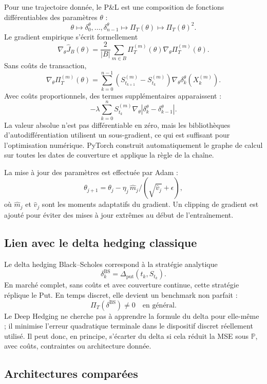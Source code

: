 \documentclass[11pt,a4paper]{article}
\begin{document}
Pour une trajectoire donnée, le P\&L est une composition de fonctions
différentiables des paramètres $\theta$ :
\[
\theta
\mapsto
\delta_0^\theta,\ldots,\delta_{n-1}^\theta
\mapsto
\Pi_T(\theta)
\mapsto
\Pi_T(\theta)^2.
\]
Le gradient empirique s'écrit formellement
\[
\nabla_\theta \widehat{J}_B(\theta)
=
\frac{2}{|B|}
\sum_{m\in B}
\Pi_T^{(m)}(\theta)
\nabla_\theta \Pi_T^{(m)}(\theta).
\]
Sans coûts de transaction,
\[
\nabla_\theta \Pi_T^{(m)}(\theta)
=
\sum_{k=0}^{n-1}
\left(S_{t_{k+1}}^{(m)}-S_{t_k}^{(m)}\right)
\nabla_\theta \delta_k^\theta(X_k^{(m)}).
\]
Avec coûts proportionnels, des termes supplémentaires apparaissent :
\[
-\lambda
\sum_{k=0}^{n}
S_{t_k}^{(m)}
\nabla_\theta
\left|
\delta_k^\theta-\delta_{k-1}^\theta
\right|.
\]
La valeur absolue n'est pas différentiable en zéro, mais les bibliothèques
d'autodifférentiation utilisent un sous-gradient, ce qui est suffisant pour
l'optimisation numérique. PyTorch construit automatiquement le graphe de calcul
sur toutes les dates de couverture et applique la règle de la chaîne.

La mise à jour des paramètres est effectuée par Adam :
\[
\theta_{j+1}
=
\theta_j-\eta_j\,\widehat{m}_j/(\sqrt{\widehat{v}_j}+\epsilon),
\]
où $\widehat{m}_j$ et $\widehat{v}_j$ sont les moments adaptatifs du gradient.
Un clipping de gradient est ajouté pour éviter des mises à jour extrêmes au
début de l'entraînement.

\subsection{Lien avec le delta hedging classique}

Le delta hedging Black--Scholes correspond à la stratégie analytique
\[
\delta_k^{\mathrm{BS}}
=
\Delta_{\mathrm{put}}(t_k,S_{t_k}).
\]
En marché complet, sans coûts et avec couverture continue, cette stratégie
réplique le Put. En temps discret, elle devient un benchmark non parfait :
\[
\Pi_T(\delta^{\mathrm{BS}})
\neq 0
\quad\text{en général}.
\]
Le Deep Hedging ne cherche pas à apprendre la formule du delta pour elle-même ;
il minimise l'erreur quadratique terminale dans le dispositif discret réellement
utilisé. Il peut donc, en principe, s'écarter du delta si cela réduit la MSE
sous $\mathbb{P}$, avec coûts, contraintes ou architecture donnée.

\subsection{Architectures comparées}
\end{document}
